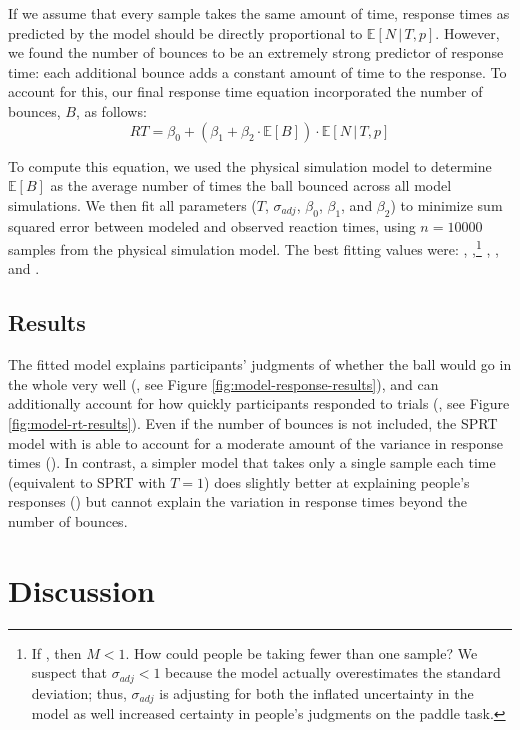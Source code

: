\documentclass[10pt,letterpaper]{article}
\begin{document}
If we assume that every sample takes the same amount of time, response times as predicted by the model should be directly proportional to $\mathbb{E}[N\,|\,T,p]$.
However, we found the number of bounces to be an extremely strong predictor of response time: each additional bounce adds a constant amount of time to the response.
To account for this, our final response time equation incorporated the number of bounces, $B$, as follows:
\begin{equation}
RT = \beta_0 + (\beta_1 + \beta_2\cdot{}\mathbb{E}[B]) \cdot{}\mathbb{E}[N\,|\,T,p]
\label{eq:rt}
\end{equation}

To compute this equation, we used the physical simulation model to determine $\mathbb{E}[B]$ as the average number of times the ball bounced across all model simulations.
We then fit all parameters ($T$, $\sigma_{adj}$, $\beta_0$, $\beta_1$, and $\beta_2$) to minimize sum squared error between modeled and observed reaction times, using $n=10000$ samples from the physical simulation model.
The best fitting values were: \threshold{}, \sdadj{},\footnote{If \sdadj{}, then $M<1$. How could people be taking fewer than one sample?
We suspect that $\sigma_{adj}<1$ because the model actually overestimates the standard deviation; thus, $\sigma_{adj}$ is adjusting for both the inflated uncertainty in the model as well increased certainty in people's judgments on the paddle task.} \betazero{}, \betaone{}, and \betatwo{}.

\subsection{Results}

The fitted model explains participants' judgments of whether the ball would go in the whole very well (\HoleResponseCorr{}, see Figure \ref{fig:model-response-results}), and can additionally account for how quickly participants responded to trials (\HoleRTCorr{}, see Figure \ref{fig:model-rt-results}).
Even if the number of bounces is not included, the SPRT model with \threshold{} is able to account for a moderate amount of the variance in response times (\NoBouncesHoleRTCorr{}).
In contrast, a simpler model that takes only a single sample each time (equivalent to SPRT with $T=1$) does slightly better at explaining people's responses (\RawHoleResponseCorr{}) but cannot explain the variation in response times beyond the number of bounces.

\section{Discussion}
\end{document}
